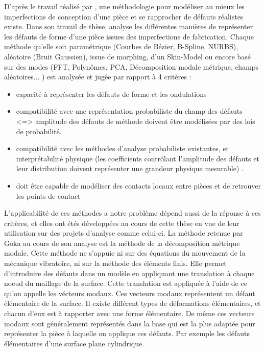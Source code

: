 \documentclass[a4paper,10pt]{article}
\begin{document}
D'après le travail réalisé par \cite{Goka2019Jun}, une méthodologie pour modéliser au mieux les imperfections de conception d'une pièce et se rapprocher de défauts réalistes existe. 
Dans son travail de thèse, \cite{Goka2019Jun} analyse les différentes manières de représenter les défauts de forme d'une pièce issues des imperfections de fabrication. Chaque méthode qu'elle soit paramétrique (Courbes de Bézier, B-Spline, NURBS), aléatoire (Bruit Gaussien), issue de morphing, d'un Skin-Model ou encore basé sur des modes (FFT, Polynômes, PCA, Décomposition modale métrique, champs aléatoires... ) est analysée et jugée par rapport à 4 critères : 
\begin{itemize}
	\item capacité à représenter les défauts de forme et les ondulations
	\item compatibilité avec une représentation probabiliste du champ des défauts <=> amplitude des défauts de méthode doivent être modélisées par des lois de probabilité.
	\item compatibilité avec les méthodes d'analyse probabiliste existantes, et interprétabilité physique (les coefficients contrôlant l'amplitude des défauts et leur distribution doivent représenter une grandeur physique mesurable) . 
	\item doit être capable de modéliser des contacts locaux entre pièces et de retrouver les points de contact 
\end{itemize}

L'applicabilité de ces méthodes a notre problème dépend aussi de la réponse à ces critères, et elles ont étés développées au cours de cette thèse en vue de leur utilisation sur des projets d'analyse comme celui-ci. 
La méthode retenue par Goka au cours de son analyse est la méthode de la décomposition métrique modale. 
Cette méthode ne s'appuie ni sur des équations du mouvement de la mécanique vibratoire, ni sur la méthode des éléments finis. Elle permet d'introduire des défauts dans un modèle en appliquant une translation à chaque noeud du maillage de la surface. Cette translation est appliquée à l'aide de ce qu'on appelle les vécteurs modaux. 
Ces vecteurs modaux représentent un défaut élémentaire de la surface. Il existe différent types de déformations élémentaires, et chacun d'eux est à rapporter avec une forme élémentaire. De même ces vecteurs modaux sont généralement représentés dans la base qui est la plus adaptée pour représenter la pièce à laquelle on applique ces défauts. Par exemple les défauts élémentaires d'une surface plane cylindrique. 
\end{document}
